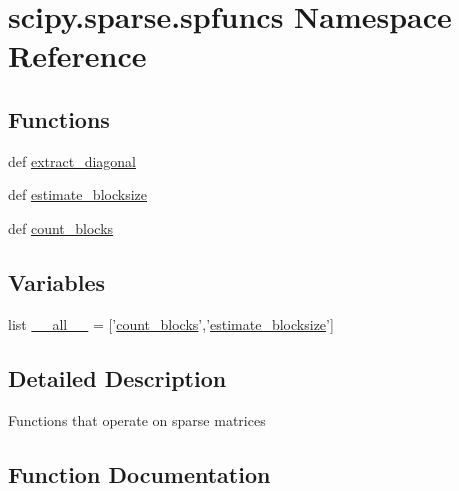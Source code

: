 \hypertarget{namespacescipy_1_1sparse_1_1spfuncs}{}\section{scipy.\+sparse.\+spfuncs Namespace Reference}
\label{namespacescipy_1_1sparse_1_1spfuncs}
\subsection*{Functions}
\begin{DoxyCompactItemize}
\item 
def \hyperlink{namespacescipy_1_1sparse_1_1spfuncs_a042f0c715b6da60ae388c23a2093f498}{extract\+\_\+diagonal}
\item 
def \hyperlink{namespacescipy_1_1sparse_1_1spfuncs_a64344b6a855fb64eb67f897e8d5d27a8}{estimate\+\_\+blocksize}
\item 
def \hyperlink{namespacescipy_1_1sparse_1_1spfuncs_a2f664cde37cfe1d13b1f2c4468710b87}{count\+\_\+blocks}
\end{DoxyCompactItemize}
\subsection*{Variables}
\begin{DoxyCompactItemize}
\item 
list \hyperlink{namespacescipy_1_1sparse_1_1spfuncs_ab2bb9a17cea2e9f1c8d4f5193c79cd0f}{\+\_\+\+\_\+all\+\_\+\+\_\+} = \mbox{[}'\hyperlink{namespacescipy_1_1sparse_1_1spfuncs_a2f664cde37cfe1d13b1f2c4468710b87}{count\+\_\+blocks}','\hyperlink{namespacescipy_1_1sparse_1_1spfuncs_a64344b6a855fb64eb67f897e8d5d27a8}{estimate\+\_\+blocksize}'\mbox{]}
\end{DoxyCompactItemize}


\subsection{Detailed Description}
\begin{DoxyVerb}Functions that operate on sparse matrices
\end{DoxyVerb}
 

\subsection{Function Documentation}
\hypertarget{namespacescipy_1_1sparse_1_1spfuncs_a2f664cde37cfe1d13b1f2c4468710b87}{}
